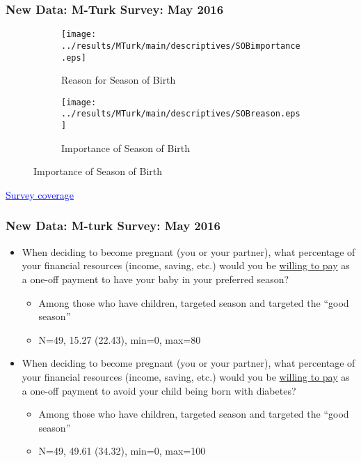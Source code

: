 \documentclass[10pt,letterpaper,subeqn]{beamer}
\begin{document}
\begin{frame}[label=MTurk]
  \frametitle{New Data: M-Turk Survey: May 2016}
  \begin{figure}[htpb!]
    \begin{center}
      \caption{Introductory Survey Results}
      \begin{subfigure}{.5\textwidth}
        \centering
      \texttt{[image: ../results/MTurk/main/descriptives/SOBimportance.eps]}
      \caption{Reason for Season of Birth}
      \label{fig:importanceMTurk}
      \end{subfigure}%
      \begin{subfigure}{.5\textwidth}
        \centering
        \texttt{[image: ../results/MTurk/main/descriptives/SOBreason.eps]}
        \caption{Importance of Season of Birth}
        \label{fig:reasonMTurk}
      \end{subfigure}
    \end{center}
  \end{figure}
\hyperlink{MTurkCover}{\footnotesize \textcolor{blue}{Survey coverage}}
\end{frame}

\begin{frame}
  \frametitle{New Data: M-turk Survey: May 2016}
  \begin{itemize}
  \item When deciding to become pregnant (you or your partner), what percentage of your financial resources (income, saving, etc.) would you be \underline{willing to pay} as a one-off payment to \textcolor[rgb]{0.00,0.18,0.51}{have your baby in your preferred season}?
    \begin{itemize}
    \item Among those who have children, targeted season and targeted the ``good season''
    \item N=49, \textcolor[rgb]{0.00,0.18,0.51}{15.27} (22.43), min=0, max=80
    \end{itemize}
  \end{itemize}
  \begin{itemize}
  \item When deciding to become pregnant (you or your partner), what percentage of your financial resources (income, saving, etc.) would you be \underline{willing to pay} as a one-off payment to \textcolor[rgb]{1.00,0.00,0.00}{avoid your child being born with diabetes}?
    \begin{itemize}
    \item Among those who have children, targeted season and targeted the ``good season''
    \item N=49, \textcolor[rgb]{1.00,0.00,0.00}{49.61} (34.32), min=0, max=100
    \end{itemize}
  \end{itemize}
\end{frame}
\end{document}
